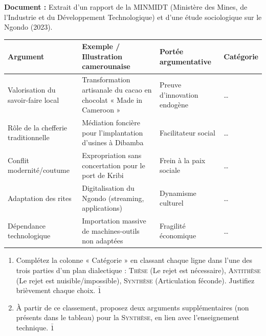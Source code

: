 \documentclass[11pt]{article}
\begin{document}
\begin{exercice}
\textbf{Document :} Extrait d'un rapport de la MINMIDT (Ministère des Mines, de l'Industrie et du Développement Technologique) et d'une étude sociologique sur le Ngondo (2023).

\begin{tabularx}{\linewidth}{>{\hsize=1.2\hsize}X>{\hsize=1.8\hsize}X>{\hsize=1.8\hsize}X>{\hsize=1.2\hsize}X}
\hline
\textbf{Argument} & \textbf{Exemple / Illustration camerounaise} & \textbf{Portée argumentative} & \textbf{Catégorie} \\
\hline
Valorisation du savoir-faire local & Transformation artisanale du cacao en chocolat « Made in Cameroon » & Preuve d'innovation endogène & \ldots \\
\hline
Rôle de la chefferie traditionnelle & Médiation foncière pour l'implantation d'usines à Dibamba & Facilitateur social & \ldots \\
\hline
Conflit modernité/coutume & Expropriation sans concertation pour le port de Kribi & Frein à la paix sociale & \ldots \\
\hline
Adaptation des rites & Digitalisation du Ngondo (streaming, applications) & Dynamisme culturel & \ldots \\
\hline
Dépendance technologique & Importation massive de machines-outils non adaptées & Fragilité économique & \ldots \\
\hline
\end{tabularx}

\begin{enumerate}
    \item Complétez la colonne « Catégorie » en classant chaque ligne dans l'une des trois parties d'un plan dialectique : \textsc{Thèse} (Le rejet est nécessaire), \textsc{Antithèse} (Le rejet est nuisible/impossible), \textsc{Synthèse} (Articulation féconde). Justifiez brièvement chaque choix. $\bar{1}$
    \item À partir de ce classement, proposez deux arguments supplémentaires (non présents dans le tableau) pour la \textsc{Synthèse}, en lien avec l'enseignement technique. $\bar{1}$
\end{enumerate}
\end{exercice}
\end{document}

